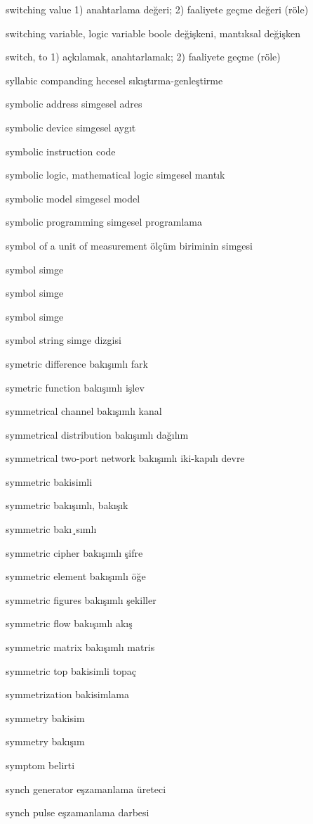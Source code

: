 \documentclass[12pt,fleqn]{article}\usepackage{../../common}
\begin{document}
switching value 1) anahtarlama değeri; 2) faaliyete geçme değeri (röle)

switching variable, logic variable boole değişkeni, mantıksal değişken

switch, to 1) açkılamak, anahtarlamak; 2) faaliyete geçme (röle)

syllabic companding hecesel sıkıştırma-genleştirme

symbolic address simgesel adres

symbolic device simgesel aygıt

symbolic instruction code

symbolic logic, mathematical logic simgesel mantık

symbolic model simgesel model

symbolic programming simgesel programlama

symbol of a unit of measurement ölçüm biriminin simgesi

symbol simge

symbol simge

symbol simge

symbol string simge dizgisi

symetric difference bakışımlı fark

symetric function bakışımlı işlev

symmetrical channel bakışımlı kanal

symmetrical distribution bakışımlı dağılım

symmetrical two-port network bakışımlı iki-kapılı devre

symmetric bakisimli

symmetric bakışımlı, bakışık

symmetric bakı¸sımlı

symmetric cipher bakışımlı şifre

symmetric element bakışımlı öğe

symmetric figures bakışımlı şekiller

symmetric flow bakışımlı akış

symmetric matrix bakışımlı matris

symmetric top bakisimli topaç

symmetrization bakisimlama

symmetry bakisim

symmetry bakışım

symptom belirti

synch generator eşzamanlama üreteci

synch pulse eşzamanlama darbesi
\end{document}
